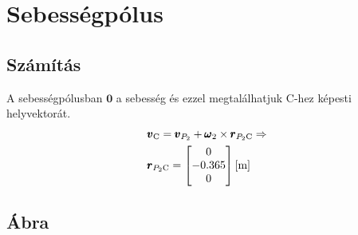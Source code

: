 \section{Sebességpólus}

\subsection{Számítás}
A sebességpólusban $\pmb{0}$ a sebesség és ezzel megtalálhatjuk $\text{C}$-hez képesti helyvektorát.
\begin{align}
	&\pmb{v}_\text{C} = \pmb{v}_{P_2} + \pmb{\omega}_2 \times \pmb{r}_{{P_2}\text{C}} \Rightarrow \\
	&\pmb{r}_{{P_2}\text{C}} =
	\begin{bmatrix}
		0 \\ -0.365 \\ 0
	\end{bmatrix} \siunit{}{\m}
\end{align}
\newpage

\subsection{Ábra}
\structurespeedpole
